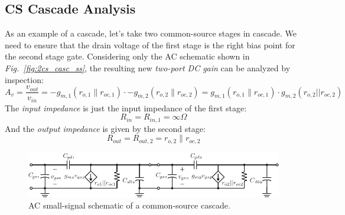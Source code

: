\subsection{CS Cascade Analysis}
As an example of a cascade, let's take two common-source stages in cascade.  We need to ensure that the drain voltage of the first stage is the right bias point for the second stage gate.  Considering only the AC schematic shown in \emph{Fig.~\ref{fig:2cs_casc_ss}}, the resulting new \textit{two-port DC gain} can be analyzed by inspection:
    \begin{equation}
        A_v = \frac{v_{out}}{v_{in}} = -g_{m,1} \left(r_{o,1} \parallel r_{oc,1}\right)
                \cdot  -g_{m,2} \left(r_{o,2} \parallel r_{oc,2}\right)
        = \boxed{g_{m,1} \left(r_{o,1} \parallel r_{oc,1}\right) \cdot g_{m,2}\left(r_{o,2}||r_{oc,2}\right)}
    \end{equation}
The \textit{input impedance} is just the input impedance of the first stage:
    \begin{equation}
        R_{in} = R_{in,1} = \boxed{\infty\Omega}
    \end{equation} 
And the \textit{output impedance} is given by the second stage:
    \begin{equation}
        R_{out} = R_{out,2} = \boxed{r_{o,2} \parallel r_{oc,2}}
    \end{equation}
\newpage
\begin{figure}[t]
\centering
\includegraphics[scale=1.05]{3cs_casc_ss_cap}
\caption{AC small-signal schematic of a common-source cascade.}
\label{fig:3cs_casc_ss_cap}
\end{figure}
